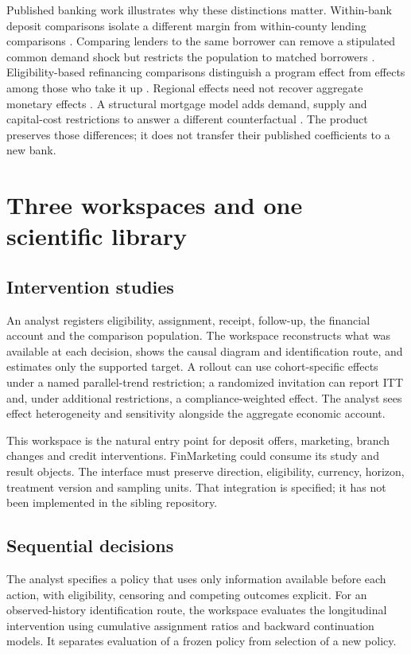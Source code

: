 \documentclass[11pt,a4paper,openany]{book}
\begin{document}
Published banking work illustrates why these distinctions matter.
Within-bank deposit comparisons isolate a different margin from within-county
lending comparisons \citep{drechsler2017}. Comparing lenders to the same
borrower can remove a stipulated common demand shock but restricts the
population to matched borrowers \citep{mian2006}. Eligibility-based
refinancing comparisons distinguish a program effect from effects among
those who take it up \citep{agarwal2020}. Regional effects need not recover
aggregate monetary effects \citep{beraja2019}. A structural mortgage model
adds demand, supply and capital-cost restrictions to answer a different
counterfactual \citep{benetton2021}. The product preserves those differences;
it does not transfer their published coefficients to a new bank.

\chapter{Three workspaces and one scientific library}

\section{Intervention studies}

An analyst registers eligibility, assignment, receipt, follow-up, the
financial account and the comparison population. The workspace reconstructs
what was available at each decision, shows the causal diagram and
identification route, and estimates only the supported target.
A rollout can use cohort-specific effects under a named parallel-trend
restriction; a randomized invitation can report ITT and, under additional
restrictions, a compliance-weighted effect. The analyst sees effect
heterogeneity and sensitivity alongside the aggregate economic account.

This workspace is the natural entry point for deposit offers, marketing,
branch changes and credit interventions. FinMarketing could consume its
study and result objects. The interface must preserve direction, eligibility,
currency, horizon, treatment version and sampling units. That integration
is specified; it has not been implemented in the sibling repository.

\section{Sequential decisions}

The analyst specifies a policy that uses only information available before
each action, with eligibility, censoring and competing outcomes explicit.
For an observed-history identification route, the workspace evaluates the
longitudinal intervention using cumulative assignment ratios and backward
continuation models. It separates evaluation of a frozen policy from
selection of a new policy.
\end{document}

